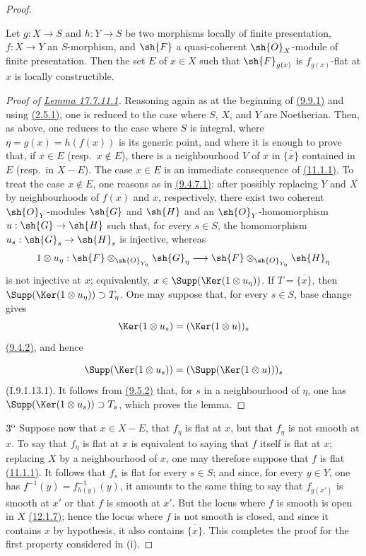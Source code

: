 \begin{proof}
\begin{lemma}[17.7.11.1]
\label{IV.17.7.11.1}
Let $g:X\to S$ and $h:Y\to S$ be two morphisms locally of finite presentation, $f:X\to Y$ an $S$-morphism, and $\sh{F}$ a quasi-coherent $\sh{O}_X$-module of finite presentation.
Then the set $E$ of $x\in X$ such that $\sh{F}_{g(x)}$ is $f_{g(x)}$-flat at $x$ is locally constructible.
\end{lemma}

\begin{proof}[Proof of {\hyperlink{ega4.c04.lem.17-7-11-1}{Lemma 17.7.11.1}}]
Reasoning again as at the beginning of {\hyperlink{ega4.c04.prop.9-9-1}{(9.9.1)}} and using {\hyperlink{ega4.c04.prop.2-5-1}{(2.5.1)}}, one is reduced to the case where $S$, $X$, and $Y$ are Noetherian.
Then, as above, one reduces to the case where $S$ is integral, where $\eta=g(x)=h(f(x))$ is its generic point, and where it is enough to prove that, if $x\in E$ (resp.\ $x\notin E$), there is a neighbourhood $V$ of $x$ in $\overline{\{x\}}$ contained in $E$ (resp.\ in $X-E$).
The case $x\in E$ is an immediate consequence of {\hyperlink{ega4.c04.thm.11-1-1}{(11.1.1)}}.
To treat the case $x\notin E$, one reasons as in {\hyperlink{ega4.c04.lem.9-4-7-1}{(9.4.7.1)}}: after possibly replacing $Y$ and $X$ by neighbourhoods of $f(x)$ and $x$, respectively, there exist two coherent $\sh{O}_Y$-modules $\sh{G}$ and $\sh{H}$ and an $\sh{O}_Y$-homomorphism $u:\sh{G}\to\sh{H}$ such that, for every $s\in S$, the homomorphism $u_s:\sh{G}_s\to\sh{H}_s$ is injective, whereas
\[
1\otimes u_\eta:\sh{F}\otimes_{\sh{O}_{Y_\eta}}\sh{G}_\eta
\longrightarrow
\sh{F}\otimes_{\sh{O}_{Y_\eta}}\sh{H}_\eta
\]
is not injective at $x$; equivalently, $x\in\Supp(\Ker(1\otimes u_\eta))$.
If $T=\overline{\{x\}}$, then $\Supp(\Ker(1\otimes u_\eta))\supset T_\eta$.
One may suppose that, for every $s\in S$, base change gives
\[
\Ker(1\otimes u_s)=(\Ker(1\otimes u))_s
\]
{\hyperlink{ega4.c04.prop.9-4-2}{(9.4.2)}}, and hence


\[
\Supp(\Ker(1\otimes u_s))=(\Supp(\Ker(1\otimes u)))_s
\]
(I.9.1.13.1).
It follows from {\hyperlink{ega4.c04.cor.9-5-2}{(9.5.2)}} that, for $s$ in a neighbourhood of $\eta$, one has $\Supp(\Ker(1\otimes u_s))\supset T_s$, which proves the lemma.
\end{proof}

$3\textsuperscript{o}$ Suppose now that $x\in X-E$, that $f_\eta$ is flat at $x$, but that $f_\eta$ is not smooth at $x$.
To say that $f_\eta$ is flat at $x$ is equivalent to saying that $f$ itself is flat at $x$; replacing $X$ by a neighbourhood of $x$, one may therefore suppose that $f$ is flat {\hyperlink{ega4.c04.thm.11-1-1}{(11.1.1)}}.
It follows that $f_s$ is flat for every $s\in S$; and since, for every $y\in Y$, one has $f^{-1}(y)=f_{h(y)}^{-1}(y)$, it amounts to the same thing to say that $f_{g(x')}$ is smooth at $x'$ or that $f$ is smooth at $x'$.
But the locus where $f$ is smooth is open in $X$ {\hyperlink{ega4.c04.cor.12-1-7}{(12.1.7)}}; hence the locus where $f$ is not smooth is closed, and since it contains $x$ by hypothesis, it also contains $\overline{\{x\}}$.
This completes the proof for the first property considered in (i).


\end{proof}
